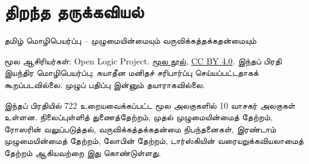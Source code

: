 \documentclass[11pt,a4paper,openany]{memoir}
\begin{document}
\raggedright
\raggedbottom
\pagestyle{plain}
\chapter*{திறந்த தருக்கவியல்}
\noindent தமிழ் மொழிபெயர்ப்பு -- முழுமையின்மையும் வருவிக்கத்தக்கதன்மையும்

\noindent மூல ஆசிரியர்கள்: Open Logic Project.
\href{https://github.com/OpenLogicProject/OpenLogic}{மூல நூல்},
\href{https://creativecommons.org/licenses/by/4.0/}{CC BY 4.0}.
இந்தப் பிரதி இயந்திர மொழிபெயர்ப்பு; சுயாதீன மனிதச் சரிபார்ப்பு செய்யப்பட்டதாகக்
கூறப்படவில்லை. முழுப் பதிப்பு இன்னும் தயாராகவில்லை.

\noindent இந்தப் பிரதியில் 722 உறையவைக்கப்பட்ட மூல அலகுகளில் 10 வாசகர்
அலகுகள் உள்ளன. நிலைப்புள்ளித் துணைத்தேற்றம், முதல் முழுமையின்மைத்
தேற்றம், ரோஸரின் வலுப்படுத்தல், வருவிக்கத்தக்கதன்மை நிபந்தனைகள்,
இரண்டாம் முழுமையின்மைத் தேற்றம், லோபின் தேற்றம், டார்ஸ்கியின்
வரையறுக்கவியலாமைத் தேற்றம் ஆகியவற்றை இது கொண்டுள்ளது.

\clearpage
\tableofcontents*

\end{document}
